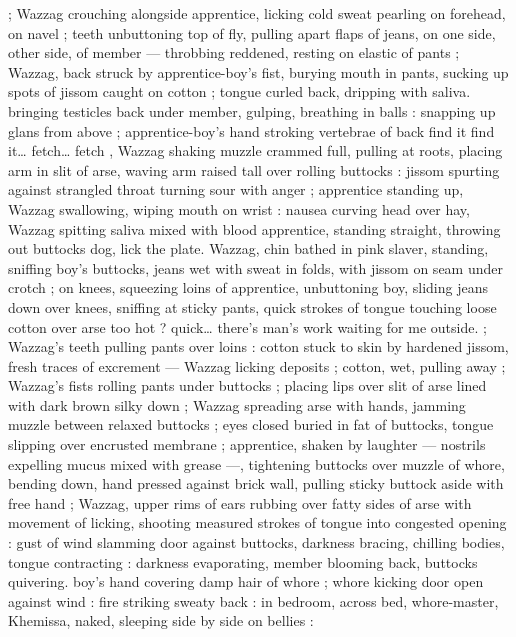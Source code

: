 {; Wazzag crouching alongside apprentice, licking cold sweat pearling 
on forehead, on navel ; teeth unbuttoning top of fly, pulling apart 
flaps of jeans, on one side, other side, of member --- throbbing 
reddened, resting on elastic of pants ; Wazzag, back struck by 
apprentice-boy's fist, burying mouth in pants, sucking up spots of 
jissom caught on cotton ; tongue curled back, dripping with saliva. 
bringing testicles back under member, gulping, breathing in balls : 
snapping up glans from above ; apprentice-boy's hand stroking 
vertebrae of back{\td} {\gl} find it{\td} find it{\ldots} fetch{\ldots} fetch{\td} {\gr}, Wazzag 
shaking muzzle crammed full, pulling at roots, placing arm in slit of 
arse, waving arm raised tall over rolling buttocks : jissom spurting 
against strangled throat turning sour with anger ; apprentice 
standing up, Wazzag swallowing, wiping mouth on wrist : nausea 
curving head over hay, Wazzag spitting saliva mixed with blood 
apprentice, standing straight, throwing out buttocks{\td} {\gl} dog, lick the 
plate.{\gr} Wazzag, chin bathed in pink slaver, standing, sniffing boy's 
buttocks, jeans wet with sweat in folds, with jissom on seam under 
crotch ; on knees, squeezing loins of apprentice, unbuttoning boy, 
sliding jeans down over knees, sniffing at sticky pants, quick strokes 
of tongue touching loose cotton over arse{\td} {\gl} too hot ?{\td} quick{\ldots} 
there's man's work waiting for me outside. {\gr} ; Wazzag's teeth pulling 
pants over loins : cotton stuck to skin by hardened jissom, fresh 
traces of excrement --- Wazzag licking deposits ; cotton, wet, pulling 
away ; Wazzag's fists rolling pants under buttocks ; placing lips over 
slit of arse lined with dark brown silky down ; Wazzag spreading arse 
with hands, jamming muzzle between relaxed buttocks ; eyes closed 
buried in fat of buttocks, tongue slipping over encrusted membrane 
; apprentice, shaken by laughter --- nostrils expelling mucus mixed 
with grease ---, tightening buttocks over muzzle of whore, bending 
down, hand pressed against brick wall, pulling sticky buttock aside 
with free hand ; Wazzag, upper rims of ears rubbing over fatty sides 
of arse with movement of licking, shooting measured strokes of 
tongue into congested opening : gust of wind slamming door against 
buttocks, darkness bracing, chilling bodies, tongue contracting : 
darkness evaporating, member blooming back, buttocks quivering. 
boy's hand covering damp hair of whore ; whore kicking door open 
against wind : fire striking sweaty back : in bedroom, across bed, 
whore-master, Khemissa, naked, sleeping side by side on bellies : 
}
